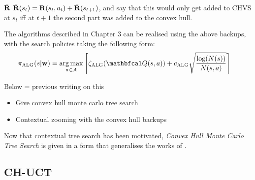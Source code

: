      $\bar{\mathbf{R}}$  $\bar{\mathbf{R}}(s_t) = \mathbf{R}(s_t,a_t) + \bar{\mathbf{R}}(s_{t+1})$, and say that this would only get added to CHVS at $s_t$ iff at $t+1$ the second part was added to the convex hull.


    The algorithms described in Chapter 3  can be realised using the above backups, with the search policies taking the following form:
    \begin{align}
        \pialg(s|\bff{w}) &= \argmax_{a\in\cl{A}} \left[
            \zetaalg(\bfcl{Q}(s,a)) + \calg \sqrt{\frac{\log(N(s))}{N(s,a)}} \right]
    \end{align}







    Below = previous writing on this

    \begin{itemize}
        \item Give convex hull monte carlo tree search
        \item Contextual zooming with the convex hull backups
    \end{itemize}





    Now that contextual tree search has been motivated, \textit{Convex Hull Monte Carlo Tree Search} is given in a form that generalises the works of .










    \subsection{CH-UCT}
    \label{sec:5-2-1-chuct}

